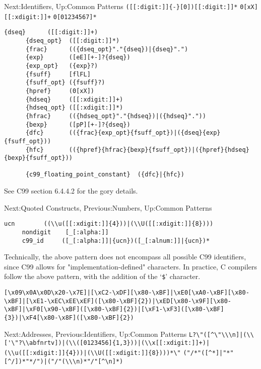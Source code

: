 \documentclass[openany,oneside]{book}
\begin{document}
Next:Identifiers,
Up:Common Patterns \verb`([[:digit:]]{-}[0])[[:digit:]]*`  \verb`0[xX][[:xdigit:]]+`  \verb`0[01234567]*` 
\begin{verbatim}
{dseq}      ([[:digit:]]+)
      {dseq_opt}  ([[:digit:]]*)
      {frac}      (({dseq_opt}"."{dseq})|{dseq}".")
      {exp}       ([eE][+-]?{dseq})
      {exp_opt}   ({exp}?)
      {fsuff}     [flFL]
      {fsuff_opt} ({fsuff}?)
      {hpref}     (0[xX])
      {hdseq}     ([[:xdigit:]]+)
      {hdseq_opt} ([[:xdigit:]]*)
      {hfrac}     (({hdseq_opt}"."{hdseq})|({hdseq}"."))
      {bexp}      ([pP][+-]?{dseq})
      {dfc}       (({frac}{exp_opt}{fsuff_opt})|({dseq}{exp}{fsuff_opt}))
      {hfc}       (({hpref}{hfrac}{bexp}{fsuff_opt})|({hpref}{hdseq}{bexp}{fsuff_opt}))
     
      {c99_floating_point_constant}  ({dfc}|{hfc})
\end{verbatim}


See C99 section 6.4.4.2 for the gory details.


Next:Quoted Constructs,
Previous:Numbers,
Up:Common Patterns
\begin{verbatim}
ucn        ((\\u([[:xdigit:]]{4}))|(\\U([[:xdigit:]]{8})))
     nondigit    [_[:alpha:]]
     c99_id     ([_[:alpha:]]|{ucn})([_[:alnum:]]|{ucn})*
\end{verbatim}


Technically, the above pattern does not encompass all possible C99 identifiers, since C99 allows for
"implementation-defined" characters. In practice, C compilers follow the above pattern, with the
addition of the ‘\verb`$`’ character.
\begin{verbatim}
[\x09\x0A\x0D\x20-\x7E]|[\xC2-\xDF][\x80-\xBF]|\xE0[\xA0-\xBF][\x80-\xBF]|[\xE1-\xEC\xEE\xEF]([\x80-\xBF]{2})|\xED[\x80-\x9F][\x80-\xBF]|\xF0[\x90-\xBF]([\x80-\xBF]{2})|[\xF1-\xF3]([\x80-\xBF]{3})|\xF4[\x80-\x8F]([\x80-\xBF]{2})
\end{verbatim}



Next:Addresses,
Previous:Identifiers,
Up:Common Patterns \verb`L?\"([^\"\\\n]|(\\['\"?\\abfnrtv])|(\\([0123456]{1,3}))|(\\x[[:xdigit:]]+)|(\\u([[:xdigit:]]{4}))|(\\U([[:xdigit:]]{8})))*\"`  \verb`("/*"([^*]|"*"[^/])*"*/")|("/"(\\\n)*"/"[^\n]*)` 
\end{document}
